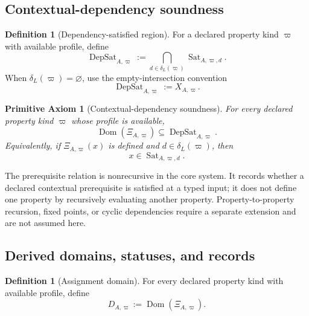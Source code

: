 \documentclass[11pt]{article}
\newcommand{\DepSat}{\operatorname{DepSat}}
\newcommand{\Sat}{\operatorname{Sat}}
\newcommand{\Dom}{\operatorname{Dom}}
\newtheorem{axiom}{Primitive Axiom}
\theoremstyle{definition}
\newtheorem{definition}[theorem]{Definition}
\theoremstyle{remark}
\begin{document}
\subsection{Contextual-dependency soundness}

\begin{definition}[Dependency-satisfied region]
For a declared property kind \(\varpi\) with available profile, define
\[
\DepSat_{A,\varpi}:=
\bigcap_{d\in\delta_L(\varpi)}\Sat_{A,\varpi,d}.
\]
When \(\delta_L(\varpi)=\varnothing\), use the empty-intersection convention
\[
\DepSat_{A,\varpi}:=X_{A,\varpi}.
\]
\end{definition}

\begin{axiom}[Contextual-dependency soundness]
\label{ax:dependency}
For every declared property kind \(\varpi\) whose profile is available,
\[
\Dom(\Xi_{A,\varpi})\subseteq\DepSat_{A,\varpi}.
\]
Equivalently, if \(\Xi_{A,\varpi}(x)\) is defined and \(d\in\delta_L(\varpi)\), then
\[
x\in\Sat_{A,\varpi,d}.
\]
\end{axiom}

The prerequisite relation is nonrecursive in the core system.
It records whether a declared contextual prerequisite is satisfied at a typed input; it does not define one property by recursively evaluating another property.
Property-to-property recursion, fixed points, or cyclic dependencies require a separate extension and are not assumed here.

\subsection{Derived domains, statuses, and records}

\begin{definition}[Assignment domain]
For every declared property kind with available profile, define
\[
D_{A,\varpi}:=\Dom(\Xi_{A,\varpi}).
\]
\end{definition}
\end{document}

